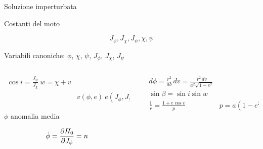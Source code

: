 \begin{wordonframe}{Soluzione imperturbata}

\begin{block}{Costanti del moto}

\begin{equation*}
J_{\phi}, J_{\chi}, J_{\psi}, \chi, \psi
\end{equation*}


\end{block}


Variabili canoniche: $\phi$, $\chi$, $\psi$, $J_{\phi}$, $J_{\chi}$, $J_{\psi}$

\begin{columns}  \begin{column}{0.5\textwidth}

\begin{align*}
\cos{i}=\frac{J_{\psi}}{J_{\chi}}\ w=\chi+v\\
&v(\phi,e)\ e(J_{\phi},J_{\chi})
\end{align*}

$\phi$ anomalia media


\begin{equation*}
\dot{\phi}=\PDy{J_{\phi}}{H_0}=n
\end{equation*}

\end{column} \begin{column}{0.5\textwidth}

\begin{align*}
&d\phi=\frac{r^2}{ab}\,dv=\frac{r^2\,dv}{a^2\sqrt{1-e^2}}\\
&\sin{\beta}=\sin{i}\sin{w}\\
&\frac{1}{r}=\frac{1+e\cos{v}}{p}
&p=a(1-e^2)
\end{align*}


\end{column}  \end{columns}


\end{wordonframe}




